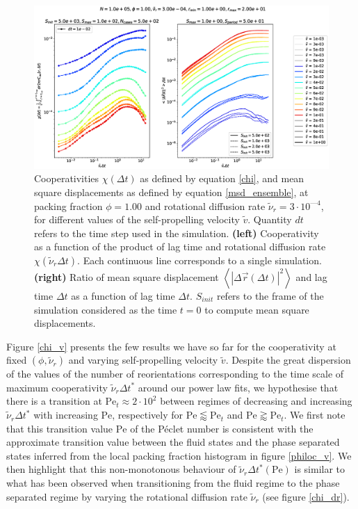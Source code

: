 \documentclass[class=report, float=false, crop=false]{standalone}
\begin{document}
\begin{figure}[h!]
\centering
\includegraphics[width=\textwidth]{figures/figs/intCuu_msdt_Dk8000_Rh3000_Nq1000_Io5000_Mn1000_Cn5000_RMINl1000_RMAXm2000.eps}
\caption{Cooperativities $\chi(\Delta t)$ as defined by equation \ref{chi}, and mean square displacements as defined by equation \ref{msd_ensemble}, at packing fraction $\phi = 1.00$ and rotational diffusion rate $\tilde{\nu}_r = 3\cdot10^{—4}$, for different values of the self-propelling velocity $\tilde{v}$. Quantity $dt$ refers to the time step used in the simulation. \textbf{(left)} Cooperativity as a function of the product of lag time and rotational diffusion rate $\chi(\tilde{\nu}_r \Delta t)$. Each continuous line corresponds to a single simulation. \textbf{(right)} Ratio of mean square displacement $\left<|\Delta\vec{r}(\Delta t)|^2\right>$ and lag time $\Delta t$ as a function of lag time $\Delta t$. $S_{init}$ refers to the frame of the simulation considered as the time $t=0$ to compute mean square displacements.}
\label{chi_v_msd}
\end{figure}

Figure \ref{chi_v} presents the few results we have so far for the cooperativity at fixed $(\phi, \tilde{\nu}_r)$ and varying self-propelling velocity $\tilde{v}$. Despite the great dispersion of the values of the number of reorientations corresponding to the time scale of maximum cooperativity $\tilde{\nu}_r \Delta t^*$ around our power law fits, we hypothesise that there is a transition at $\text{Pe}_t \approx 2\cdot10^2$ between regimes of decreasing and increasing $\tilde{\nu}_r \Delta t^*$ with increasing $\text{Pe}$, respectively for $\text{Pe} \lessapprox \text{Pe}_t$ and $\text{Pe} \gtrapprox \text{Pe}_t$. We first note that this transition value $\text{Pe}$ of the P\'eclet number is consistent with the approximate transition value between the fluid states and the phase separated states inferred from the local packing fraction histogram in figure \ref{philoc_v}. We then highlight that this non-monotonous behaviour of $\tilde{\nu}_r \Delta t^*(\text{Pe})$ is similar to what has been observed when transitioning from the fluid regime to the phase separated regime by varying the rotational diffusion rate $\tilde{\nu}_r$ (see figure \ref{chi_dr}).\\
\end{document}
